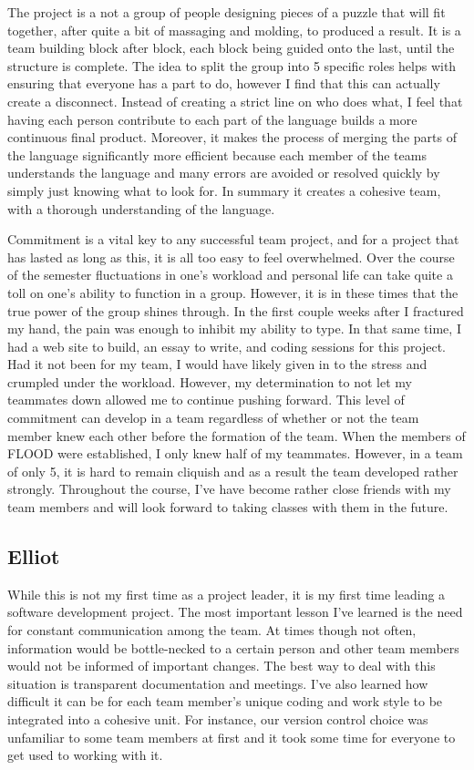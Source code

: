 \documentclass[12pt]{report}
\begin{document}
The project is a not a group of people designing pieces of a puzzle that will fit together, after quite a bit of massaging and molding, to produced a result. It is a team building block after block, each block being guided onto the last, until the structure is complete. The idea to split the group into 5 specific roles helps with ensuring that everyone has a part to do, however I find that this can actually create a disconnect. Instead of creating a strict line on who does what, I feel that having each person contribute to each part of the language builds a more continuous final product. Moreover, it makes the process of merging the parts of the language significantly more efficient because each member of the teams understands the language and many errors are avoided or resolved quickly by simply just knowing what to look for. In summary it creates a cohesive team, with a thorough understanding of the language.

Commitment is a vital key to any successful team project, and for a project that has lasted as long as this, it is all too easy to feel overwhelmed. Over the course of the semester fluctuations in one’s workload and personal life can take quite a toll on one’s ability to function in a group. However, it is in these times that the true power of the group shines through. In the first couple weeks after I fractured my hand, the pain was enough to inhibit my ability to type. In that same time, I had a web site to build, an essay to write, and coding sessions for this project. Had it not been for my team, I would have likely given in to the stress and crumpled under the workload. However, my determination to not let my teammates down allowed me to continue pushing forward. This level of commitment can develop in a team regardless of whether or not the team member knew each other before the formation of the team. When the members of FLOOD were established, I only knew half of my teammates. However, in a team of only 5, it is hard to remain cliquish and as a result the team developed rather strongly. Throughout the course, I've have become rather close friends with my team members and will look forward to taking classes with them in the future.

\subsection{Elliot}

While this is not my first time as a project leader, it is my first time leading a software development project. The most important lesson I’ve learned is the need for constant communication among the team. At times though not often, information would be bottle-necked to a certain person and other team members would not be informed of important changes. The best way to deal with this situation is transparent documentation and meetings. I’ve also learned how difficult it can be for each team member’s unique coding and work style to be integrated into a cohesive unit. For instance, our version control choice was unfamiliar to some team members at first and it took some time for everyone to get used to working with it.
\end{document}
